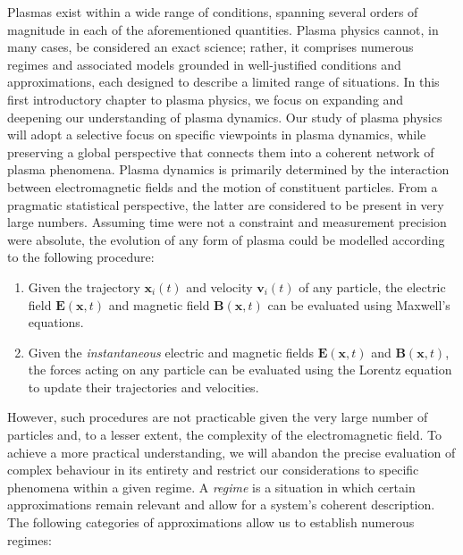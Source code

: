 Plasmas exist within a wide range of conditions, spanning several orders of magnitude in each of the aforementioned quantities. Plasma physics cannot, in many cases, be considered an exact science; rather, it comprises numerous regimes and associated models grounded in well-justified conditions and approximations, each designed to describe a limited range of situations. In this first introductory chapter to plasma physics, we focus on expanding and deepening our understanding of plasma dynamics. Our study of plasma physics will adopt a selective focus on specific viewpoints in plasma dynamics, while preserving a global perspective that connects them into a coherent network of plasma phenomena. Plasma dynamics is primarily determined by the interaction between electromagnetic fields and the motion of constituent particles. From a pragmatic statistical perspective, the latter are considered to be present in very large numbers. Assuming time were not a constraint and measurement precision were absolute, the evolution of any form of plasma could be modelled according to the following procedure:

\begin{enumerate}
    \item Given the trajectory $\mathbf{x}_i(t)$ and velocity $\mathbf{v}_i(t)$ of any particle, the electric field $\mathbf{E}(\mathbf{x},t)$ and magnetic field $\mathbf{B}(\mathbf{x},t)$ can be evaluated using Maxwell's equations.
    \item Given the \textit{instantaneous} electric and magnetic fields $\mathbf{E}(\mathbf{x},t)$ and $\mathbf{B}(\mathbf{x},t)$, the forces acting on any particle can be evaluated using the Lorentz equation to update their trajectories and velocities.
\end{enumerate}

However, such procedures are not practicable given the very large number of particles and, to a lesser extent, the complexity of the electromagnetic field. To achieve a more practical understanding, we will abandon the precise evaluation of complex behaviour in its entirety and restrict our considerations to specific phenomena within a given regime. A \textit{regime} is a situation in which certain approximations remain relevant and allow for a system's coherent description. The following categories of approximations allow us to establish numerous regimes:

